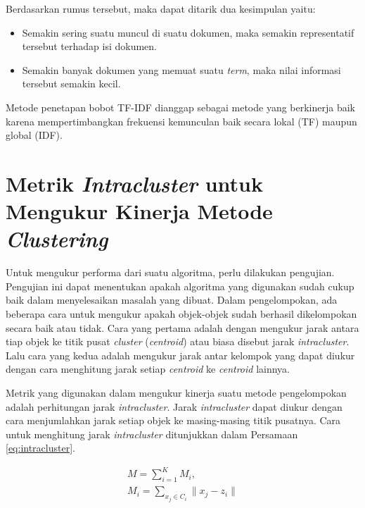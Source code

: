 Berdasarkan rumus tersebut, maka dapat ditarik dua kesimpulan yaitu:
\begin{itemize}
	\item Semakin sering suatu \term muncul di suatu dokumen, maka semakin representatif \term tersebut terhadap isi dokumen.
	\item Semakin banyak dokumen yang memuat suatu \textit{term}, maka nilai informasi \term tersebut semakin kecil. %
\end{itemize}

Metode penetapan bobot TF-IDF dianggap sebagai metode yang berkinerja baik karena mempertimbangkan frekuensi kemunculan \term baik secara lokal (TF) maupun global (IDF).

\section{Metrik \textit{Intracluster} untuk Mengukur Kinerja Metode \textit{Clustering}}
\label{sec:metric}
Untuk mengukur performa dari suatu algoritma, perlu dilakukan pengujian. Pengujian ini dapat menentukan apakah algoritma yang digunakan sudah cukup baik dalam menyelesaikan masalah yang dibuat. Dalam pengelompokan, ada beberapa cara untuk mengukur apakah objek-objek sudah berhasil dikelompokan secara baik atau tidak. Cara yang pertama adalah dengan mengukur jarak antara tiap objek ke titik pusat \textit{cluster} (\textit{centroid}) atau biasa disebut jarak \textit{intracluster}. Lalu cara yang kedua adalah mengukur jarak antar kelompok yang dapat diukur dengan cara menghitung jarak setiap \textit{centroid} ke \textit{centroid} lainnya.

Metrik yang digunakan \cite{maulik2000genetic} dalam mengukur kinerja suatu metode pengelompokan adalah perhitungan jarak \textit{intracluster}. Jarak \textit{intracluster} dapat diukur dengan cara menjumlahkan jarak setiap objek ke masing-masing titik pusatnya. Cara untuk menghitung jarak \textit{intracluster} ditunjukkan dalam Persamaan \ref{eq:intracluster}.

\begin{equation}
\label{eq:intracluster}
	\begin{gathered}
	M=\sum_{i=1}^K M_i , \\
	M_i=\sum_{x_j\in C_i}\parallel x_j-z_i\parallel
	\end{gathered}
\end{equation}

